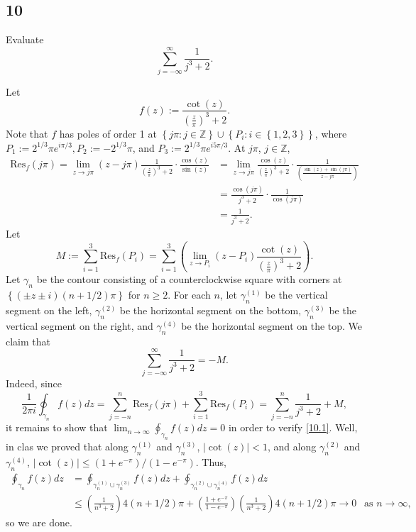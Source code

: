 \documentclass[12pt]{article}
\begin{document}
\subsection*{10}
\begin{tcolorbox}
Evaluate
\[ \sum_{j=-\infty}^{\infty}\frac{1}{j^{3} + 2}. \]
\end{tcolorbox}
Let
\[ f(z) := \frac{\cot(z)}{\left( \frac{z}{\pi} \right)^{3} + 2}. \]
Note that $f$ has poles of order 1 at $\left\{ j\pi : j \in \mathbb{Z} \right\}\cup \left\{ P_{i} : i \in \left\{ 1,2,3 \right\} \right\}$,
where $P_{1} := 2^{1/3}\pi e^{i\pi/3}, P_{2} := -2^{1/3}\pi$, and $P_{3} := 2^{1/3}\pi e^{i5\pi /3}$.
At $j\pi$, $j \in \mathbb{Z}$,
\begin{align*}
\text{Res}_{f}(j\pi) = \lim_{z \rightarrow j\pi}(z - j\pi)\frac{1}{\left( \frac{z}{\pi} \right)^{3} + 2}\cdot \frac{\cos(z)}{\sin(z)} & =
\lim_{z\rightarrow j\pi} \frac{\cos(z)}{\left( \frac{z}{\pi} \right)^{3} + 2}\cdot \frac{1}{\left( \frac{\sin(z) + \sin(j\pi)}{z - j\pi} \right)} \\
& = \frac{\cos(j\pi)}{j^{3} + 2}\cdot \frac{1}{\cos(j\pi)} \\
& = \frac{1}{j^{3} + 2}.
\end{align*}
Let
\[ M := \sum_{i=1}^{3}\text{Res}_{f}(P_{i}) = \sum_{i=1}^{3}\left( \lim_{z \rightarrow P_{i}} (z - P_{i})\frac{\cot(z)}{\left( \frac{z}{\pi}
\right)^{3} + 2}\right). \]
Let $\gamma_n$ be the contour consisting of a counterclockwise square with corners at $\left\{ (\pm z \pm i)(n+1/2)\pi \right\}$ for $n \geq 2$. For
each $n$, let
$\gamma_{n}^{(1)}$ be the vertical segment on the left, $\gamma_{n}^{(2)}$ be the horizontal segment on the bottom, $\gamma_{n}^{(3)}$ be the vertical
segment on the right, and $\gamma_{n}^{(4)}$ be the horizontal segment on the top.
We claim that 
\begin{equation}
\sum_{j=-\infty}^{\infty}\frac{1}{j^{3} + 2} = - M.
\label{10.1}
\end{equation}
Indeed, since 
\[ \frac{1}{2\pi i}\oint_{\gamma_n}f(z)dz = \sum_{j=-n}^{n}\text{Res}_{f}(j\pi) + \sum_{i=1}^{3}\text{Res}_{f}(P_{i}) = \sum_{j=-n}^{n}\frac{1}{j^{3}
+ 2} + M, \]
it remains to show that $\lim_{n\rightarrow \infty}\oint_{\gamma_{n}}f(z)dz = 0$ in order to verify \eqref{10.1}. Well, in clas we proved that along
$\gamma_{n}^{(1)}$ and $\gamma_{n}^{(3)}$, $|\cot(z)| < 1$, and along $\gamma_{n}^{(2)}$ and $\gamma_{n}^{(4)}$, $|\cot(z)| \leq (1 + e^{-\pi}) / (1 -
e^{-\pi})$. Thus,
\begin{align*}
\oint_{\gamma_{n}}f(z)dz & = \oint_{\gamma_{n}^{(1)}\cup\gamma_{n}^{(3)}}f(z)dz + \oint_{\gamma_{n}^{(2)}\cup\gamma_{n}^{(4)}}f(z)dz \\
& \leq \left(\frac{1}{n^{3} + 2}\right) 4(n + 1/2)\pi + \left( \frac{1 + e^{-\pi}}{1 - e^{-\pi}} \right)\left( \frac{1}{n^{3} + 2} \right)4(n + 1/2)\pi
\rightarrow 0 \ \ \text{ as } n\rightarrow \infty, 
\end{align*}
so we are done.
\end{document}
